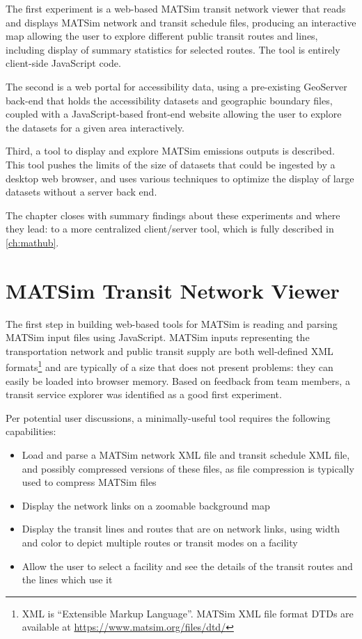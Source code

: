 The first experiment is a web-based MATSim transit network viewer that reads and displays MATSim network and transit schedule files, producing an interactive map allowing the user to explore different public transit routes and lines, including display of summary statistics for selected routes. The tool is entirely client-side JavaScript code.

The second is a web portal for accessibility data, using a pre-existing \gls{GeoServer} back-end that holds the accessibility datasets and geographic boundary files, coupled with a JavaScript-based front-end website allowing the user to explore the datasets for a given area interactively.

Third, a tool to display and explore MATSim emissions outputs is described. This tool pushes the limits of the size of datasets that could be ingested by a desktop web browser, and uses various techniques to optimize the display of large datasets without a server back end.

The chapter closes with summary findings about these experiments and where they lead: to a more centralized client/server tool, which is fully described in \autoref{ch:mathub}.

\hypertarget{server-experiments-transit}{%
\section{MATSim Transit Network Viewer}\label{server-experiments-transit}}

The first step in building web-based tools for MATSim is reading and parsing MATSim input files using JavaScript. MATSim inputs representing the transportation network and public transit supply are both well-defined \gls{XML} formats\footnote{XML is ``Extensible Markup Language''. MATSim XML file format DTDs are available at \url{https://www.matsim.org/files/dtd/}} and are typically of a size that does not present problems: they can easily be loaded into browser memory. Based on feedback from team members, a transit service explorer was identified as a good first experiment.

Per potential user discussions, a minimally-useful tool requires the following capabilities:

\begin{itemize}
  \tightlist
  \item
    Load and parse a MATSim network XML file and transit schedule XML file, and possibly compressed versions of these files, as file compression is typically used to compress MATSim files
  \item
    Display the network links on a zoomable background map
  \item
    Display the transit lines and routes that are on network links, using width and color to depict multiple routes or transit modes on a facility
  \item
    Allow the user to select a facility and see the details of the transit routes and the lines which use it
\end{itemize}

